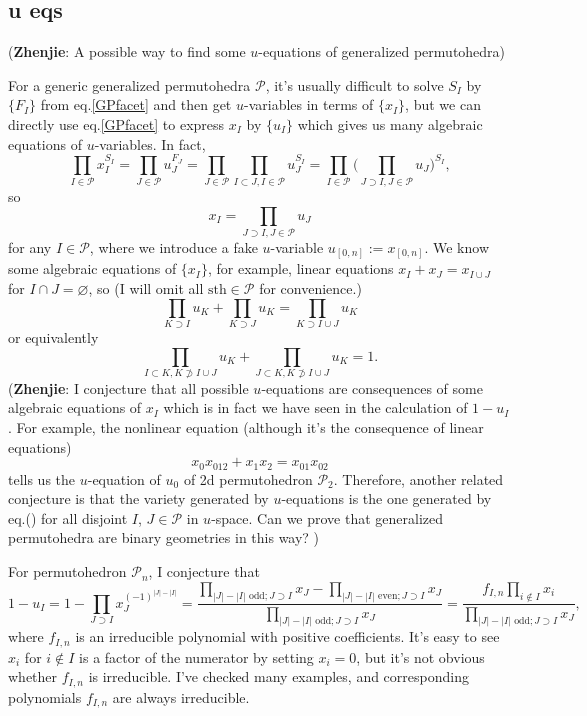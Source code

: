 \documentclass[hidelinks,12pt]{article}
\renewcommand{\theequation}{\thesection.\arabic{equation}}
\renewcommand{\theequation}{\arabic{equation}}
\begin{document}
\subsection{u eqs}

({\bf Zhenjie}: A possible way to find some $u$-equations of generalized permutohedra)

For a generic generalized permutohedra $\mathscr P$, it's usually difficult to solve $S_I$ by $\{F_I\}$  from eq.\eqref{GPfacet} and then get $u$-variables in terms of $\{x_I\}$, but we can directly use eq.\eqref{GPfacet} to express $x_I$ by $\{u_I\}$ which gives us many algebraic equations of $u$-variables. In fact,
\[
\prod_{I\in \mathscr P}x_I^{S_I}=\prod_{J\in \mathscr P}u_J^{F_J}=\prod_{J\in\mathscr P}\prod_{I\subset J,I\in \mathscr P}u_J^{S_I}=\prod_{I\in\mathscr P}\biggl(\prod_{J\supset I,J\in\mathscr P}u_J\bigg)^{S_I},
\]
so
\begin{equation}
x_I=\prod_{J\supset I,J\in\mathscr P}u_J
\end{equation}
for any $I\in \mathscr P$, where we introduce a fake $u$-variable 
$u_{[0,n]}:=x_{[0,n]}$. We know some algebraic equations of $\{x_I\}$, 
for example, linear equations $x_I+x_J=x_{I\cup J}$ for $I\cap J=\varnothing$, 
so (I will omit all $\text{sth}\in \mathscr P$ for convenience.)
\begin{equation*}
	\prod_{K\supset I}u_K+\prod_{K\supset J}u_K=\prod_{K\supset I\cup J}u_K
\end{equation*}
or equivalently
\begin{equation}
\prod_{I\subset K,K\not\supset I\cup J}u_K +
\prod_{J\subset K,K\not\supset I\cup J}u_K = 1.
\end{equation}
({\bf Zhenjie}: I conjecture that all possible $u$-equations are consequences of 
some algebraic equations of $x_I$ which is in fact we have seen in 
the calculation of $1-u_I$. For example, the nonlinear equation (although it's
the consequence of linear equations)
\[
	x_0x_{012}+x_1x_2=x_{01}x_{02}
\]
tells us the $u$-equation of $u_0$ of 2d permutohedron $\mathscr P_2$. Therefore,
another related conjecture is that the variety generated by $u$-equations 
is the one generated by eq.(\theequation) for all disjoint $I$, $J\in \mathscr P$ 
in $u$-space. Can we prove that generalized permutohedra are binary geometries in
this way?
)

For permutohedron $\mathscr P_n$, I conjecture that
\[
1-u_I=1-\prod_{J\supset I}x_J^{(-1)^{|J|-|I|}}=\frac{\prod_{|J|-|I| \text{ odd}; J\supset I}x_J-\prod_{|J|-|I| \text{ even}; J\supset I}x_J}{\prod_{|J|-|I| \text{ odd}; J\supset I}x_J}
=\frac{f_{I,n}\prod_{i\not\in I}x_i}{\prod_{|J|-|I| \text{ odd}; J\supset I}x_J},
\]
where $f_{I,n}$ is an irreducible polynomial with positive coefficients. It's easy to see $x_i$ for $i\not\in I$ is a factor of the numerator by setting $x_i=0$, but it's not obvious whether $f_{I,n}$ is irreducible. I've checked many examples, and corresponding polynomials $f_{I,n}$ are always irreducible.
\end{document}
